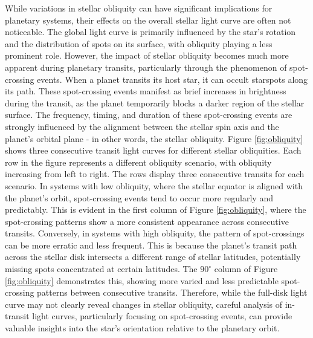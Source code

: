 \documentclass[twocolumn]{aastex631}
\begin{document}
While variations in stellar obliquity can have significant implications for planetary systems, their effects on the overall stellar light curve 
are often not noticeable. The global light curve is primarily influenced by the star's rotation and the distribution of spots on its surface, 
with obliquity playing a less prominent role. However, the impact of stellar obliquity becomes much more apparent during planetary transits, 
particularly through the phenomenon of spot-crossing events. When a planet transits its host star, it can occult starspots along its path. 
These spot-crossing events manifest as brief increases in brightness during the transit, as the planet temporarily blocks a darker region of the stellar 
surface. The frequency, timing, and duration of these spot-crossing events are strongly influenced by the alignment between the stellar spin axis and 
the planet's orbital plane - in other words, the stellar obliquity. Figure \ref{fig:obliquity} shows three consecutive transit light curves for 
different stellar obliquities. Each row in the figure represents a different obliquity scenario, with obliquity increasing from left to right. 
The rows display three consecutive transits for each scenario. 
In systems with low obliquity, where the stellar equator is aligned with the 
planet's orbit, spot-crossing events tend to occur more regularly and predictably. This is evident in the first column of Figure \ref{fig:obliquity}, where the spot-crossing patterns show a more consistent appearance across consecutive transits. 
Conversely, in systems with high obliquity, the pattern of spot-crossings can be more erratic and less frequent. This is because the planet's transit path across 
the stellar disk intersects a different range of stellar latitudes, potentially missing spots concentrated at certain latitudes. The $90^\circ$ column of 
Figure \ref{fig:obliquity} demonstrates this, showing more varied and less predictable spot-crossing patterns between consecutive transits. 
Therefore, while the full-disk light curve may not clearly reveal changes in stellar obliquity, careful analysis of in-transit light curves, 
particularly focusing on spot-crossing events, can provide valuable insights into the star's orientation relative to the planetary orbit. 
\end{document}
